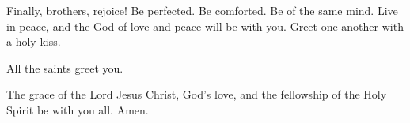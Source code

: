 \begin{paracol}{2}
\begin{otherlanguage}{english}
 Finally, brothers, rejoice! Be perfected. Be comforted.
Be of the same mind. Live in peace, and the God of love and peace will
be with you.  Greet one another with a holy kiss.

 All the saints greet you.

 The grace of the Lord Jesus Christ, God's love, and the
fellowship of the Holy Spirit be with you all. Amen.
\end{otherlanguage} \end{paracol}
